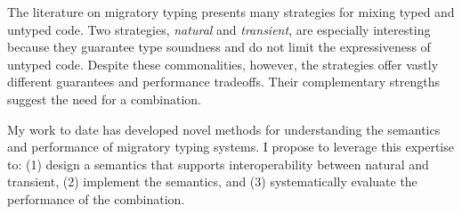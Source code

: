The literature on migratory typing presents many strategies for
 mixing typed and untyped code.
Two strategies, \emph{natural}\/ and \emph{transient}\/, are especially
 interesting because they guarantee type soundness and do not limit the
 expressiveness of untyped code.
Despite these commonalities, however, the strategies offer vastly different
 guarantees and performance tradeoffs.
Their complementary strengths suggest the need for a combination.

My work to date has developed novel methods for understanding the semantics
 and performance of migratory typing systems.
I propose to leverage this expertise to:
 (1) design a semantics that supports interoperability between natural and transient,
 (2) implement the semantics,
 and (3) systematically evaluate the performance of the combination.
